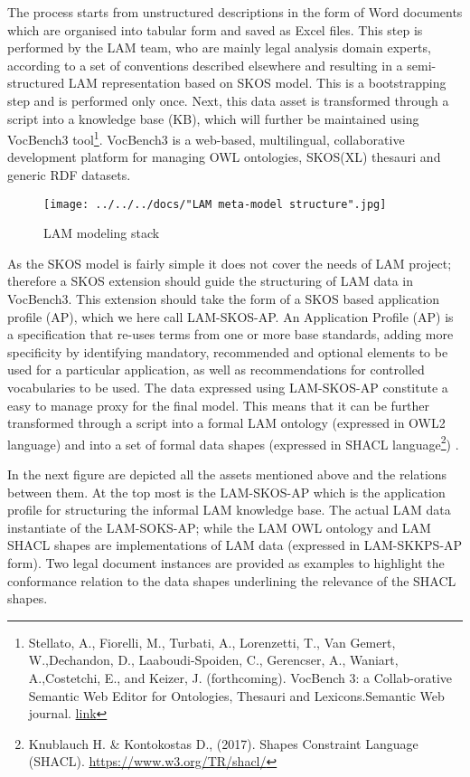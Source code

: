 The process starts from unstructured descriptions in the form of Word
documents which are organised into tabular form and saved as Excel
files. This step is performed by the LAM team, who are mainly legal
analysis domain experts, according to a set of conventions described
elsewhere and resulting in a semi-structured LAM representation based on
SKOS model. This is a bootstrapping step and is performed only once.
Next, this data asset is transformed through a script into a knowledge
base (KB), which will further be maintained using VocBench3
tool\footnote{Stellato, A., Fiorelli,
	M., Turbati, A., Lorenzetti, T., Van Gemert, W.,Dechandon, D., Laaboudi-Spoiden, C., Gerencser, A., Waniart, A.,Costetchi, E., and Keizer, J. (forthcoming). VocBench 3: a Collab-orative Semantic Web Editor for Ontologies, Thesauri and Lexicons.Semantic Web journal. \href{http://www.semantic-web-journal.net/content/vocbench-3-collaborative-semantic-web-editor-ontologies-thesauri-and-lexicons-1}{link}}. VocBench3 is a
web-based, multilingual, collaborative development platform for managing
OWL ontologies, SKOS(XL) thesauri and generic RDF datasets.

\begin{figure}[!ht]
	\centering
	\texttt{[image: ../../../docs/"LAM meta-model structure".jpg]}
	\caption{LAM modeling stack}
	\label{ont-req-modelling-stack__meta-model}
\end{figure}

As the SKOS model is fairly simple it does not cover the needs of LAM
project; therefore a SKOS extension should guide the structuring of LAM
data in VocBench3. This extension should take the form of a SKOS based
application profile (AP), which we here call LAM-SKOS-AP. An Application
Profile (AP) is a specification that re-uses terms from one or more base
standards, adding more specificity by identifying mandatory, recommended
and optional elements to be used for a particular application, as well
as recommendations for controlled vocabularies to be used. The data
expressed using LAM-SKOS-AP constitute a easy to manage proxy for the
final model. This means that it can be further transformed through a
script into a formal LAM ontology (expressed in OWL2 language) and into
a set of formal data shapes (expressed in SHACL
language\footnote{Knublauch H. \& Kontokostas D., (2017). Shapes Constraint Language (SHACL). \url{https://www.w3.org/TR/shacl/}}) .

In the next figure are depicted all the assets mentioned above and the
relations between them. At the top most is the LAM-SKOS-AP which is the
application profile for structuring the informal LAM knowledge base. The
actual LAM data instantiate of the LAM-SOKS-AP; while the LAM OWL
ontology and LAM SHACL shapes are implementations of LAM data (expressed
in LAM-SKKPS-AP form). Two legal document instances are provided as
examples to highlight the conformance relation to the data shapes
underlining the relevance of the SHACL shapes.

